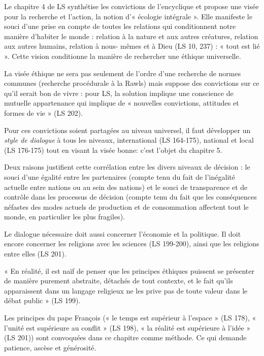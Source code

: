 Le chapitre 4 de LS synthétise les convictions de l'encyclique et propose une visée  pour la recherche et l’action, la notion d’« écologie intégrale ». Elle manifeste le souci d’une prise en compte de toutes les relations qui conditionnent notre manière d’habiter le monde : relation à la nature et aux autres créatures, relation aux autres humains, relation à nous- mêmes et à Dieu (LS 10, 237) : « tout est lié ». Cette vision conditionne la manière de rechercher une éthique universelle. 

La visée éthique ne sera pas seulement de l’ordre d’une recherche de normes communes (recherche procédurale à la Rawls) mais suppose des convictions sur ce qu’il serait bon de vivre \cite[p.335]{ricoeur_soi-meme_1990} : pour LS, la solution implique une conscience de mutuelle appartenance qui implique de « nouvelles convictions, attitudes et formes de vie » (LS 202).

Pour ces convictions soient partagées au niveau universel, il faut développer un \textit{style de dialogue} à tous les niveaux, international (LS 164-175), national et local (LS 176-175) tout en visant la visée bonne: c'est l'objet du chapitre 5.  
\begin{singlequote}
    Deux raisons justifient cette corrélation entre les divers niveaux de décision : le souci d’une égalité entre les partenaires (compte tenu du fait de l’inégalité actuelle entre nations ou au sein des nations) et le souci de transparence et de contrôle dans les processus de décision (compte tenu du fait que les conséquences néfastes des modes actuels de production et de consommation affectent tout le monde, en particulier les plus fragiles). \cite{thomasset_recherche_2019}
\end{singlequote}
Le dialogue nécessaire doit aussi concerner l’économie et la politique. Il doit encore concerner les religions avec les sciences (LS 199-200), ainsi que les religions entre elles (LS 201). 
\begin{singlequote}
    « En réalité, il est naïf de penser que les principes éthiques puissent se présenter de manière purement abstraite, détachés de tout contexte, et le fait qu’ils apparaissent dans un langage religieux ne les prive pas de toute valeur dans le débat public » (LS 199).
\end{singlequote}
 Les principes du pape François (« le temps est supérieur à l’espace » (LS 178), « l’unité est supérieure au conflit » (LS 198), « la réalité est supérieure à l’idée » (LS 201)) sont convoquées dans ce chapitre comme méthode. Ce qui demande patience, ascèse et générosité.

